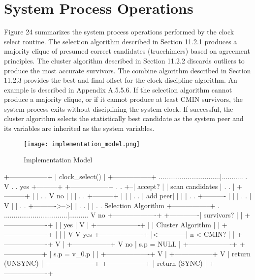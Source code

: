 \section{System Process Operations}

Figure 24 summarizes the system process operations performed by the
clock select routine.  The selection algorithm described in
Section 11.2.1 produces a majority clique of presumed correct
candidates (truechimers) based on agreement principles.  The cluster
algorithm described in Section 11.2.2 discards outliers to produce
the most accurate survivors.  The combine algorithm described in
Section 11.2.3 provides the best and final offset for the clock
discipline algorithm.  An example is described in Appendix A.5.5.6.
If the selection algorithm cannot produce a majority clique, or if it
cannot produce at least CMIN survivors, the system process exits
without disciplining the system clock.  If successful, the cluster
algorithm selects the statistically best candidate as the system peer
and its variables are inherited as the system variables.

\begin{figure}
\centering
\texttt{[image: implementation\_model.png]}
\caption{Implementation Model}
\label{implementation_model}
\end{figure}


                      +-----------------+
                      | clock\_select()  |
                      +-----------------+
................................|...........
.                               V          .
.      yes +---------+ +-----------------+ .
.       +--| accept? | | scan candidates | .
.       |  +---------+ |                 | .
.       V        no |  |                 | .
.  +---------+      |  |                 | .
.  | add peer|      |  |                 | .
.  +----------      |  |                 | .
.       |           V  |                 | .
.       +---------->-->|                 | .
.                      |                 | .
. Selection Algorithm  +-----------------+ .
.................................|..........
                                V
                    no +-------------------+
        +-------------|     survivors?    |
        |             +-------------------+
        |                       | yes
        |                       V
        |             +-------------------+
        |             | Cluster Algorithm |
        |             +-------------------+
        |                       |
        |                       V
        V         yes +-------------------+
        |<------------|     n < CMIN?     |
        |             +-------------------+
        V                       |
  +-----------------+            V no
  |   s.p = NULL    |  +-------------------+
  +-----------------+  |   s.p = v\_0.p     |
        |             +-------------------+
        V                       |
  +-----------------+            V
  | return (UNSYNC) |  +-------------------+
  +-----------------+  |   return (SYNC)   |
                      +-------------------+

